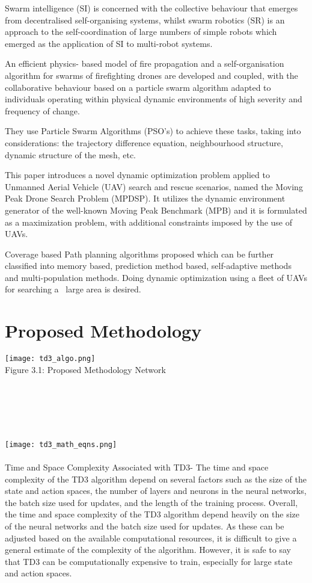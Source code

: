 \documentclass[conference]{IEEEtran}
\begin{document}
Swarm intelligence (SI) is concerned with the collective behaviour that emerges from decentralised self-organising systems, whilst swarm robotics (SR) is an approach to the self-coordination of large numbers of simple robots which emerged as the application of SI to multi-robot systems. 

An efficient physics- based model of fire propagation and a self-organisation algorithm for swarms of firefighting drones are developed and coupled, with the collaborative behaviour based on a particle swarm algorithm adapted to individuals operating within physical dynamic environments of high severity and frequency of change.

They use Particle Swarm Algorithms (PSO’s) to achieve these tasks, taking into considerations: the trajectory difference equation, neighbourhood structure, dynamic structure of the mesh, etc\cite{innocente2019self}.




This paper introduces a novel dynamic optimization problem applied to Unmanned Aerial Vehicle (UAV) search and rescue scenarios, named the Moving Peak Drone Search Problem (MPDSP). It utilizes the dynamic environment generator of the well-known Moving Peak Benchmark (MPB) and it is formulated as a maximization problem, with additional constraints imposed by the use of UAVs. 


Coverage based Path planning algorithms proposed which can be further classified into memory based, prediction method based, self-adaptive methods and multi-population methods. Doing dynamic optimization using a fleet of UAVs for searching a  large area is desired\cite{kyriakakis2021moving}.


\section{Proposed Methodology}

\graphicspath{ {./images/} }
\texttt{[image: td3\_algo.png]}\\
\caption{Figure 3.1: Proposed Methodology Network}\\\\
\\\
\graphicspath{ {./images/} }

\texttt{[image: td3\_math\_eqns.png]}\\\\

Time and Space Complexity Associated with TD3-
The time and space complexity of the TD3 algorithm depend on several factors such as the size of the state and action spaces, the number of layers and neurons in the neural networks, the batch size used for updates, and the length of the training process. 
Overall, the time and space complexity of the TD3 algorithm depend heavily on the size of the neural networks and the batch size used for updates. As these can be adjusted based on the available computational resources, it is difficult to give a general estimate of the complexity of the algorithm. However, it is safe to say that TD3 can be computationally expensive to train, especially for large state and action spaces.
\end{document}
